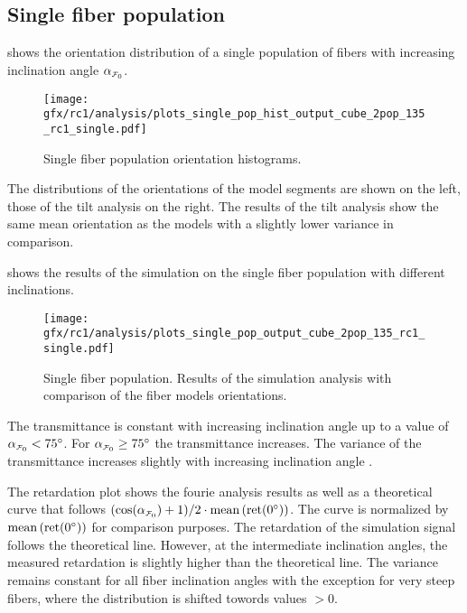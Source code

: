 \subsection{Single fiber population}
\label{sec:resSingleIncl}
%
 shows the orientation distribution of a single population of fibers with increasing inclination angle $\modelInc{}$.
% 
\begin{figure}[!t]
    \centering
    \texttt{[image: gfx/rc1/analysis/plots\_single\_pop\_hist\_output\_cube\_2pop\_135\_rc1\_single.pdf]}
    \caption{Single fiber population orientation histograms.}
    \label{fig:single_fiber_pop_hist}
\end{figure}
% 
The distributions of the orientations of the model segments are shown on the left, those of the tilt analysis on the right.
The results of the tilt analysis show the same mean orientation as the models with a slightly lower variance in comparison.
\par
% 
 shows the results of the simulation on the single fiber population with different inclinations.
\par
% 
\begin{figure}[!p]
    \centering
    \texttt{[image: gfx/rc1/analysis/plots\_single\_pop\_output\_cube\_2pop\_135\_rc1\_single.pdf]}
    \caption{Single fiber population. Results of the simulation analysis with comparison of the fiber models orientations.}
    \label{fig:single_fiber_pop_rofl}
\end{figure}
% 
The transmittance is constant with increasing inclination angle up to a value of $\modelInc<\SI{75}{\degree}$.
For $\modelInc \ge \SI{75}{\degree}$ the transmittance increases.
The variance of the transmittance increases slightly with increasing inclination angle \modelInc{}.
\par
%
The retardation plot shows the fourie analysis results as well as a theoretical curve that follows $(\cos(\modelInc) + 1) / 2 \cdot \mean\left(\mathrm{ret}(\SI{0}{\degree})\right)$.
The curve is normalized by $\operatorname{mean}\left(\mathrm{ret}(\SI{0}{\degree})\right)$ for comparison purposes.
The retardation of the simulation signal follows the theoretical line.
However, at the intermediate inclination angles, the measured retardation is slightly higher than the theoretical line.
The variance remains constant for all fiber inclination angles \modelInc{} with the exception for very steep fibers, where the distribution is shifted towords values $>0$.
\par
